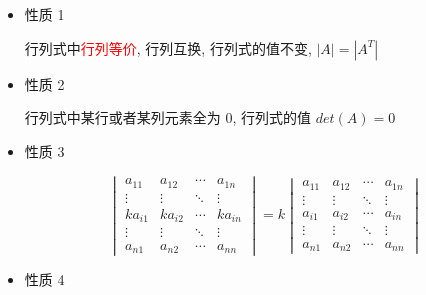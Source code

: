 \begin{corollary}[行列式的性质]
	\begin{itemize}
		\item \textcolor{purplea}{性质 1}
		
		行列式中\textcolor{red}{行列等价}, 行列互换, 行列式的值不变, $|A|=|A^{T}|$

		\item \textcolor{purplea}{性质 2} 
		
		行列式中某行或者某列元素全为 $0$, 行列式的值 $det(A) = 0$

		\item \textcolor{purplea}{性质 3}
		
		$$\begin{vmatrix}
			a_{11}  & a_{12}  & \cdots & a_{1n}\\
			\vdots  & \vdots  & \ddots & \vdots\\
			ka_{i1} & ka_{i2} & \cdots & ka_{in}\\
			\vdots  & \vdots  & \ddots & \vdots\\
			a_{n1}  & a_{n2}  & \cdots & a_{nn}
		\end{vmatrix} = k 
		\begin{vmatrix}
			a_{11} & a_{12} & \cdots & a_{1n}\\
			\vdots & \vdots & \ddots & \vdots\\
			a_{i1} & a_{i2} & \cdots & a_{in}\\
			\vdots & \vdots & \ddots & \vdots\\
			a_{n1} & a_{n2} & \cdots & a_{nn}
		\end{vmatrix}$$

		\item \textcolor{purplea}{性质 4}
		

\end{itemize}
\end{corollary}
